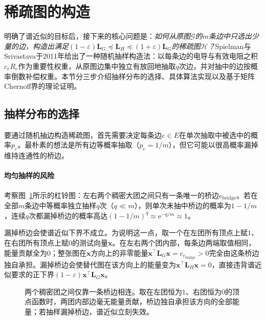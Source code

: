 \section{稀疏图的构造}
\label{sec:graph-resistance-sampling}

明确了谱近似的目标后，接下来的核心问题是：\emph{如何从原图$\mathcal G$的$m$条边中只选出少量的边，构造出满足$(1-\varepsilon)\bm L_G\preceq\bm L_H\preceq(1+\varepsilon)\bm L_G$的稀疏图$\mathcal H$？}Spielman与Srivastava于2011年给出了一种随机抽样构造法：以每条边的电导与有效电阻之积$c_e R_e$作为重要性权重，从原图边集中独立有放回地抽取$q$次边，并对抽中的边按概率倒数补偿权重。本节分三步介绍抽样分布的选择、具体算法实现以及基于矩阵Chernoff界的理论证明。

\subsection{抽样分布的选择}
\label{sec:graph-resistance-sampling-distribution}

要通过随机抽边构造稀疏图，首先需要决定每条边$e\in E$在单次抽取中被选中的概率$p_e$。最朴素的想法是所有边等概率抽取（$p_e=1/m$），但它可能以很高概率漏掉维持连通性的桥边。

\paragraph{均匀抽样的风险}

考察图~\ref{fig:graph-sparsification-bridge}所示的杠铃图：左右两个稠密大团之间只有一条唯一的桥边$e_{\mathrm{bridge}}$。若在全部$m$条边中等概率独立抽样$q$次（$q\ll m$），则单次未抽中桥边的概率为$1-1/m$，连续$q$次都漏掉桥边的概率高达$(1-1/m)^q\approx\mathrm e^{-q/m}\approx 1$。

漏掉桥边会使谱近似下界不成立。为说明这一点，取一个在左团所有顶点上赋$1$、在右团所有顶点上赋$0$的测试向量$\bm x$。在左右两个团内部，每条边两端取值相同，能量贡献全为$0$；整张图在$\bm x$方向上的非零能量$\bm x^\top\bm L_G\bm x=c_{e_{\mathrm{bridge}}}>0$完全由这条桥边独自承担。漏掉桥边会使替代图在该方向上的能量变为$\bm x^\top\bm L_H\bm x=0$，直接违背谱近似要求的正下界$(1-\varepsilon)\bm x^\top\bm L_G\bm x$。

\begin{figure}[!htb]
  \centering
  
  \caption{两个稠密团之间仅靠一条桥边相连。取在左团恒为$1$、右团恒为$0$的顶点函数时，两团内部边毫无能量贡献，桥边独自承担该方向的全部能量；若抽样漏掉桥边，谱近似立刻失效。}
  \label{fig:graph-sparsification-bridge}
\end{figure}

